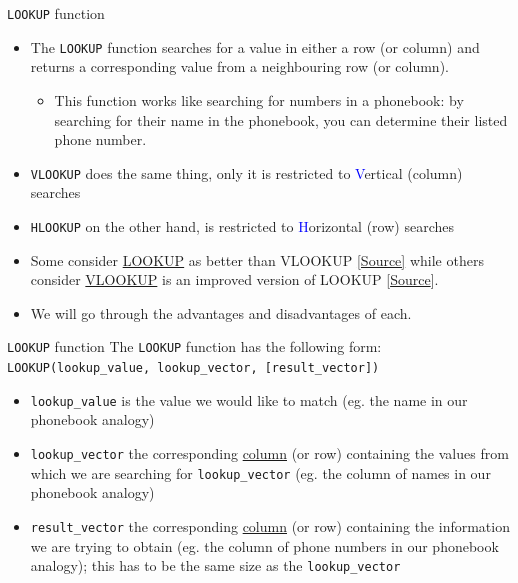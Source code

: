 \documentclass[xcolor=svgnames]{beamer}
\newcommand{\blue}[1]{{\textcolor{blue}{#1}}}
\begin{document}
\begin{frame}[fragile]{\texttt{LOOKUP} function}
\begin{itemize}
\item  The \verb|LOOKUP| function searches for a value in either a row (or column) and returns a corresponding value from a neighbouring row (or column).
\begin{itemize}
\item This function works like searching for numbers in a phonebook: by searching for their name in the phonebook, you can determine their listed phone number.
\end{itemize}
\medskip
\item \verb|VLOOKUP| %
does the same thing, only it is restricted to \blue{V}ertical (column) searches
\medskip
\item \verb|HLOOKUP| on the other hand, is restricted to \blue{H}orizontal (row) searches %
\medskip
\item Some consider  \href{https://support.office.com/en-us/article/lookup-function-446d94af-663b-451d-8251-369d5e3864cb}{LOOKUP} as better than VLOOKUP \href{https://corporatefinanceinstitute.com/resources/excel/functions/lookup-vs-vlookup/}{[Source]}
while others consider \href{https://support.office.com/en-us/article/video-vlookup-when-and-how-to-use-it-9a86157a-5542-4148-a536-724823014785}{VLOOKUP}  is  an improved version of LOOKUP [\href{https://support.office.com/en-us/article/LOOKUP-function-446D94AF-663B-451D-8251-369D5E3864CB}{Source}].  
\medskip
\item We will go through the advantages and disadvantages of each.
\end{itemize}



\end{frame}


\begin{frame}[fragile]{\texttt{LOOKUP} function}
The {\tt LOOKUP} function has the following form:
\verb|LOOKUP(lookup_value, lookup_vector, [result_vector])|
\begin{itemize}
\item {\tt lookup\_value} is the value we would like to match (eg. the name in our phonebook analogy)
\item {\tt lookup\_vector} the corresponding \underline{column} (or row) containing the values from which we are searching for {\tt lookup\_vector} (eg. the column of names in our phonebook analogy)
\item {\tt result\_vector} the corresponding \underline{column} (or row) containing the information we are trying to obtain (eg. the column of phone numbers in our phonebook analogy); this has to be the same size as the {\tt lookup\_vector}
\end{itemize}
\end{frame}
\end{document}

